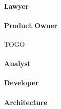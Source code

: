 
\paragraph{Lawyer}\label{par:interview-lawyer}


\paragraph{Product Owner}
TOGO

\paragraph{Analyst}\label{par:interview-analist}


\paragraph{Developer}\label{par:interview-developer}


\paragraph{Architecture}\label{par:interview-architecture}




